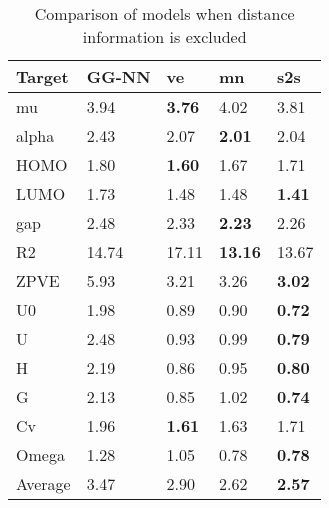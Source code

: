 \documentclass{article}
\begin{document}
\begin{table}[t]
\centering
\caption{Comparison of models when distance information is excluded}
\label{tb:spatial2}
\begin{tabular}{lllll}
\hline
Target & GG-NN  & ve  & mn & s2s \\
\hline



mu     & 3.94     & \textbf{3.76}     & 4.02            & 3.81        \\
alpha  & 2.43     & 2.07     & \textbf{2.01}            & 2.04        \\
HOMO   & 1.80     & \textbf{1.60}     & 1.67            & 1.71        \\
LUMO   & 1.73     & 1.48     & 1.48            & \textbf{1.41}        \\
gap    & 2.48     & 2.33     & \textbf{2.23}            & 2.26        \\
R2     & 14.74    & 17.11    & \textbf{13.16}           & 13.67       \\
ZPVE   & 5.93     & 3.21     & 3.26            & \textbf{3.02}        \\
U0     & 1.98     & 0.89     & 0.90            & \textbf{0.72}        \\
U      & 2.48     & 0.93     & 0.99            & \textbf{0.79}        \\
H      & 2.19     & 0.86     & 0.95            & \textbf{0.80}        \\
G      & 2.13     & 0.85     & 1.02            & \textbf{0.74}        \\
Cv     & 1.96     & \textbf{1.61}     & 1.63            & 1.71        \\
Omega  & 1.28     & 1.05     & 0.78            & \textbf{0.78}        \\
\hline
Average & 3.47 & 2.90 & 2.62 & \textbf{2.57}
\end{tabular}
\end{table}
\end{document}
